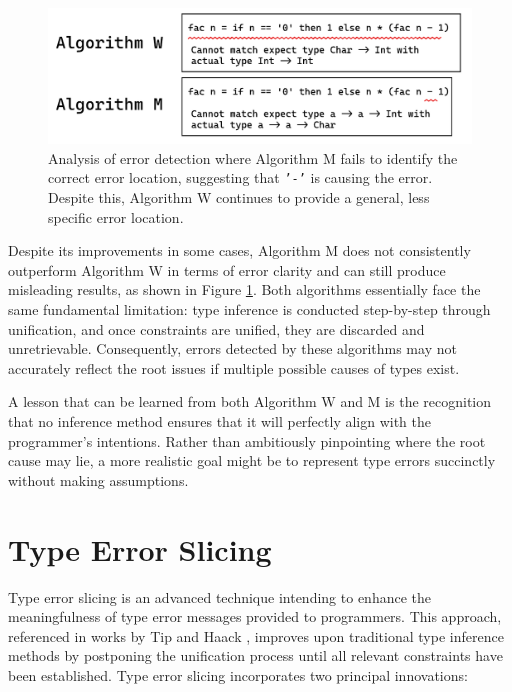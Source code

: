 \begin{figure}[hbt]
\centering  \includegraphics[width=0.8\linewidth]{AlgorithmWM2}
  \caption{
    \label{fig:algorithm-m-2}
    Analysis of error detection where Algorithm M fails to identify the correct error location, suggesting that \texttt{'-'} is causing the error. Despite this, Algorithm W continues to provide a general, less specific error location.}
\end{figure}


Despite its improvements in some cases, Algorithm M does not consistently outperform Algorithm W in terms of error clarity and can still produce misleading results, as shown in Figure \ref{fig:algorithm-m-2}. Both algorithms essentially face the same fundamental limitation: type inference is conducted step-by-step through unification, and once constraints are unified, they are discarded and unretrievable. Consequently, errors detected by these algorithms may not accurately reflect the root issues if multiple possible causes of types exist.

A lesson that can be learned from both Algorithm W and M is the recognition that no inference method ensures that it will perfectly align with the programmer’s intentions. Rather than ambitiously pinpointing where the root cause may lie, a more realistic goal might be to represent type errors succinctly without making assumptions.


\section{Type Error Slicing}

Type error slicing is an advanced technique intending to enhance the meaningfulness of type error messages provided to programmers. This approach, referenced in works by Tip \cite{Tip2001-qn} and Haack \cite{Haack2004-fr}, improves upon traditional type inference methods by postponing the unification process until all relevant constraints have been established. Type error slicing incorporates two principal innovations:


